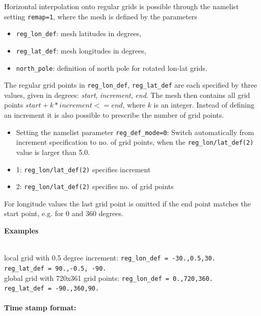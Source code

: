 Horizontal interpolation onto regular grids is possible through the namelist setting  \texttt{remap=1}, where
the mesh is defined by the parameters
\begin{itemize}
  \item \texttt{reg\_lon\_def}: mesh latitudes in degrees,
  \item \texttt{reg\_lat\_def}: mesh longitudes in degrees,
  \item \texttt{north\_pole}: definition of north pole for rotated lon-lat grids.
\end{itemize}
The regular grid points in \texttt{reg\_lon\_def}, \texttt{reg\_lat\_def} are each specified by three values, given in degrees:
\emph{start}, \emph{increment}, \emph{end}.
The mesh then contains all grid points $start + k * increment <= end$, where $k$ is an integer.
Instead of defining an increment it is also possible to prescribe the number of grid points.
\begin{itemize}
  \item Setting the namelist parameter \texttt{reg\_def\_mode=0}:
        Switch automatically from increment specification to no. of grid points,
        when the  \texttt{reg\_lon/lat\_def(2)} value is larger than 5.0.
  \item 1: \texttt{reg\_lon/lat\_def(2)} specifies increment
  \item 2: \texttt{reg\_lon/lat\_def(2)} specifies no. of grid points
\end{itemize}
For longitude values the last grid point is omitted if the end point matches the start point, e.g. for 0 and 360 degrees.

\begin{tabbing}
  \parbox{0.7\textwidth}{\textbf{Examples}} \= \\
  local grid with 0.5 degree increment: \>
  \texttt{reg\_lon\_def = -30.,0.5,30.}
  \\ \>
  \texttt{reg\_lat\_def = 90.,-0.5, -90.}
  \\[0.5em]
  global grid with 720x361 grid points: \>
  \texttt{reg\_lon\_def = 0.,720,360.}
  \\ \>
  \texttt{reg\_lat\_def = -90.,360,90.}
\end{tabbing}


\paragraph{Time stamp format:}

